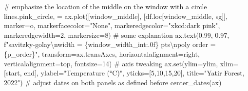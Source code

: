 \documentclass[
  letterpaper,
  DIV=11,
  numbers=noendperiod,
  oneside]{scrreprt}
\newenvironment{Shaded}{\begin{snugshade}}{\end{snugshade}}
\newcommand{\BuiltInTok}[1]{\textcolor[rgb]{0.00,0.23,0.31}{#1}}
\newcommand{\CharTok}[1]{\textcolor[rgb]{0.13,0.47,0.30}{#1}}
\newcommand{\CommentTok}[1]{\textcolor[rgb]{0.37,0.37,0.37}{#1}}
\newcommand{\DecValTok}[1]{\textcolor[rgb]{0.68,0.00,0.00}{#1}}
\newcommand{\FloatTok}[1]{\textcolor[rgb]{0.68,0.00,0.00}{#1}}
\newcommand{\NormalTok}[1]{\textcolor[rgb]{0.00,0.23,0.31}{#1}}
\newcommand{\OperatorTok}[1]{\textcolor[rgb]{0.37,0.37,0.37}{#1}}
\newcommand{\SpecialCharTok}[1]{\textcolor[rgb]{0.37,0.37,0.37}{#1}}
\newcommand{\SpecialStringTok}[1]{\textcolor[rgb]{0.13,0.47,0.30}{#1}}
\newcommand{\StringTok}[1]{\textcolor[rgb]{0.13,0.47,0.30}{#1}}
\begin{document}
\begin{Shaded}
\begin{Highlighting}[]
\CommentTok{\# emphasize the location of the middle on the window with a circle}
\NormalTok{lines.pink\_circle, }\OperatorTok{=}\NormalTok{ ax.plot([window\_middle], [df.loc[window\_middle, }\StringTok{\textquotesingle{}sg\textquotesingle{}}\NormalTok{]],}
\NormalTok{         marker}\OperatorTok{=}\StringTok{\textquotesingle{}o\textquotesingle{}}\NormalTok{, markerfacecolor}\OperatorTok{=}\StringTok{"None"}\NormalTok{, markeredgecolor}\OperatorTok{=}\StringTok{"xkcd:dark pink"}\NormalTok{, markeredgewidth}\OperatorTok{=}\DecValTok{2}\NormalTok{,}
\NormalTok{         markersize}\OperatorTok{=}\DecValTok{8}\NormalTok{)}
\CommentTok{\# some explanation}
\NormalTok{ax.text(}\FloatTok{0.99}\NormalTok{, }\FloatTok{0.97}\NormalTok{, }\SpecialStringTok{f"savitzky{-}golay}\CharTok{\textbackslash{}n}\SpecialStringTok{width = }\SpecialCharTok{\{}\NormalTok{window\_width\_int}\SpecialCharTok{:.0f\}}\SpecialStringTok{ pts}\CharTok{\textbackslash{}n}\SpecialStringTok{poly order = }\SpecialCharTok{\{}\NormalTok{p\_order}\SpecialCharTok{\}}\SpecialStringTok{"}\NormalTok{, transform}\OperatorTok{=}\NormalTok{ax.transAxes,}
\NormalTok{         horizontalalignment}\OperatorTok{=}\StringTok{\textquotesingle{}right\textquotesingle{}}\NormalTok{, verticalalignment}\OperatorTok{=}\StringTok{\textquotesingle{}top\textquotesingle{}}\NormalTok{,}
\NormalTok{         fontsize}\OperatorTok{=}\DecValTok{14}\NormalTok{)}
\CommentTok{\# axis tweaking}
\NormalTok{ax.}\BuiltInTok{set}\NormalTok{(ylim}\OperatorTok{=}\NormalTok{ylim,}
\NormalTok{        xlim}\OperatorTok{=}\NormalTok{[start, end],}
\NormalTok{        ylabel}\OperatorTok{=}\StringTok{"Temperature (°C)"}\NormalTok{,}
\NormalTok{        yticks}\OperatorTok{=}\NormalTok{[}\DecValTok{5}\NormalTok{,}\DecValTok{10}\NormalTok{,}\DecValTok{15}\NormalTok{,}\DecValTok{20}\NormalTok{],}
\NormalTok{        title}\OperatorTok{=}\StringTok{"Yatir Forest, 2022"}\NormalTok{)}
\CommentTok{\# adjust dates on both panels as defined before}
\NormalTok{center\_dates(ax)}


\end{Highlighting}
\end{Shaded}
\end{document}
